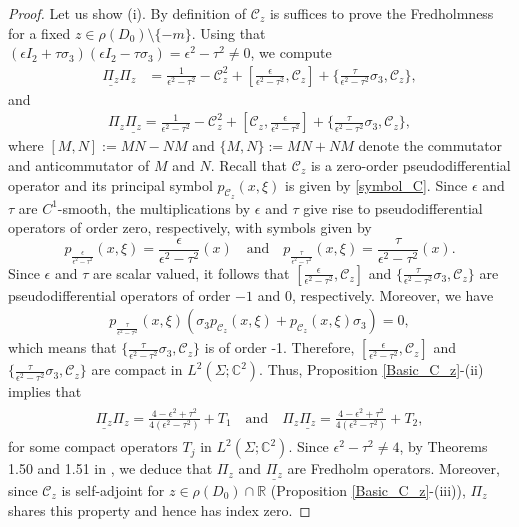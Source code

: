 \documentclass[11pt,a4paper,reqno,oneside]{amsproc}
\def \rr {{\mathbb R}}
\def \cc {{\mathbb C}}
\numberwithin{equation}{section}
\def \cc {{\mathbb{C}}}
\begin{document}
\begin{proof} Let us show (i). By  definition of $\mathscr{C}_z$ is suffices to prove the Fredholmness for a fixed $z\in\rho(D_0)\setminus\{-m\}$. Using that $(\epsilon I_2 + \tau\sigma_{3})(\epsilon I_2 - \tau\sigma_3)=\epsilon^{2} - \tau^{2}\neq 0$, we compute 
\begin{align*}
 \underline{ \Pi_z}\Pi_z&= \frac{1}{\epsilon^2-\tau^2}-\mathscr{C}_z^2+  [\frac{\epsilon}{\epsilon^2-\tau^2}, \mathscr{C}_z]+ \{\frac{\tau}{\epsilon^2-\tau^2}\sigma_3,\mathscr{C}_z\},
\end{align*}
and 
\begin{align*}
	\Pi_z\underline{ \Pi_z}= \frac{1}{\epsilon^2-\tau^2}-\mathscr{C}_z^2+  [\mathscr{C}_z, \frac{\epsilon}{\epsilon^2-\tau^2}]+ \{\frac{\tau}{\epsilon^2-\tau^2}\sigma_3,\mathscr{C}_z\},
\end{align*}
where $[M,N ]:=MN-NM$ and $\{M,N \}:=MN+NM$ denote the commutator and anticommutator of $M$ and $N$. Recall that $\mathscr{C}_{z}$ is a zero-order pseudodifferential operator and its principal symbol $p_{\mathscr{C}_z}(x,\xi)$ is given by \eqref{symbol_C}. Since $\epsilon$ and $\tau$ are $C^1$-smooth, the multiplications by $\epsilon$ and $\tau$ give rise to pseudodifferential operators of order zero, respectively, with symbols given by
\[
p_{\frac{\epsilon}{\epsilon^2-\tau^2}}(x,\xi)=\frac{\epsilon}{\epsilon^2-\tau^2}(x) \quad\text{and} \quad p_{\frac{\tau}{\epsilon^2-\tau^2}}(x,\xi)=\frac{\tau}{\epsilon^2-\tau^2}(x).
\]
Since $\epsilon$ and $\tau$ are scalar valued, it follows that $[\frac{\epsilon}{\epsilon^2-\tau^2}, \mathscr{C}_z]$ and $\{\frac{\tau}{\epsilon^2-\tau^2}\sigma_3,\mathscr{C}_{z}\}$ are pseudodifferential operators of order $-1$ and $0$, respectively. Moreover, we have 
\begin{align*}
      p_{\frac{\tau}{\epsilon^2-\tau^2}}(x,\xi)\left(\sigma_3 p_{\mathscr{C}_{z}}(x,\xi)+  p_{\mathscr{C}_{z}}(x,\xi)\sigma_3\right)= 0,
\end{align*}
which means that  $\{\frac{\tau}{\epsilon^2-\tau^2}\sigma_3,\mathscr{C}_z\}$ is of order -1. Therefore, $[\frac{\epsilon}{\epsilon^2-\tau^2}, \mathscr{C}_z]$ and
 $\{ \frac{\tau}{\epsilon^2-\tau^2}\sigma_3,\mathscr{C}_z\}$ are compact in $L^2(\Sigma;\cc^2)$. Thus, Proposition \ref{Basic_C_z}-(ii) implies that 
\begin{align}\label{inverse_Pi}\begin{split}
\underline{\Pi_{z}}\Pi_{z}= \frac{4-\epsilon^2+\tau^2}{4(\epsilon^2-\tau^2)}+ T_{1} \quad\text{and}\quad \Pi_{z}\underline{\Pi_{z}}= \frac{4-\epsilon^2+\tau^2}{4(\epsilon^2-\tau^2)}+ T_{2} ,
\end{split}
\end{align}
for some compact operators $T_j$ in $L^2(\Sigma;\cc^2)$. Since $\epsilon^2-\tau^2\neq 4$, by Theorems 1.50 and 1.51 in \cite{Aiena}, we deduce that $\Pi_{z}$ and $\underline{\Pi_{z}}$ are Fredholm operators.  Moreover, since $\mathscr{C}_z$ is self-adjoint for $z\in\rho(D_0)\cap\rr$ (Proposition \ref{Basic_C_z}-(iii)),  $\Pi_{z}$ shares this property and hence has  index zero.


\end{proof}
\end{document}
